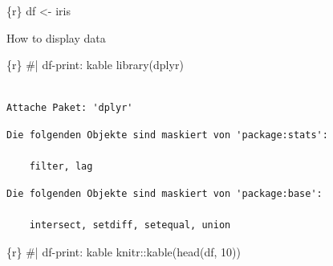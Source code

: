 \documentclass[
  letterpaper,
  DIV=11,
  numbers=noendperiod,
  oneside]{scrreprt}
\newenvironment{Shaded}{\begin{snugshade}}{\end{snugshade}}
\newcommand{\CommentTok}[1]{\textcolor[rgb]{0.37,0.37,0.37}{#1}}
\newcommand{\DecValTok}[1]{\textcolor[rgb]{0.68,0.00,0.00}{#1}}
\newcommand{\FunctionTok}[1]{\textcolor[rgb]{0.28,0.35,0.67}{#1}}
\newcommand{\InformationTok}[1]{\textcolor[rgb]{0.37,0.37,0.37}{#1}}
\newcommand{\NormalTok}[1]{\textcolor[rgb]{0.00,0.23,0.31}{#1}}
\newcommand{\OtherTok}[1]{\textcolor[rgb]{0.00,0.23,0.31}{#1}}
\newcommand{\SpecialCharTok}[1]{\textcolor[rgb]{0.37,0.37,0.37}{#1}}
\begin{document}
\begin{Shaded}
\begin{Highlighting}[]
\InformationTok{\textasciigrave{}\textasciigrave{}\textasciigrave{}\{r\}}
\NormalTok{df }\OtherTok{\textless{}{-}}\NormalTok{ iris}
\InformationTok{\textasciigrave{}\textasciigrave{}\textasciigrave{}}
\end{Highlighting}
\end{Shaded}

How to display data

\begin{Shaded}
\begin{Highlighting}[]
\InformationTok{\textasciigrave{}\textasciigrave{}\textasciigrave{}\{r\}}
\CommentTok{\#| df{-}print: kable}
\FunctionTok{library}\NormalTok{(dplyr)}
\InformationTok{\textasciigrave{}\textasciigrave{}\textasciigrave{}}
\end{Highlighting}
\end{Shaded}

\begin{verbatim}

Attache Paket: 'dplyr'
\end{verbatim}

\begin{verbatim}
Die folgenden Objekte sind maskiert von 'package:stats':

    filter, lag
\end{verbatim}

\begin{verbatim}
Die folgenden Objekte sind maskiert von 'package:base':

    intersect, setdiff, setequal, union
\end{verbatim}

\begin{Shaded}
\begin{Highlighting}[]
\InformationTok{\textasciigrave{}\textasciigrave{}\textasciigrave{}\{r\}}
\CommentTok{\#| df{-}print: kable}
\NormalTok{knitr}\SpecialCharTok{::}\FunctionTok{kable}\NormalTok{(}\FunctionTok{head}\NormalTok{(df, }\DecValTok{10}\NormalTok{))}
\InformationTok{\textasciigrave{}\textasciigrave{}\textasciigrave{}}
\end{Highlighting}
\end{Shaded}
\end{document}
